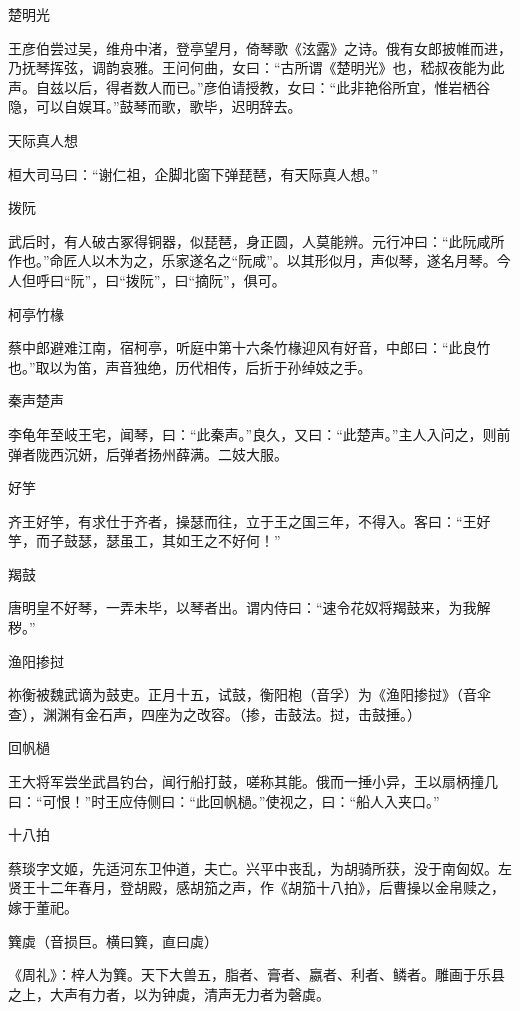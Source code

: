 \documentclass[a4paper,12pt,UTF8,twoside]{ctexbook}
\begin{document}
    楚明光
    
    王彦伯尝过吴，维舟中渚，登亭望月，倚琴歌《泫露》之诗。俄有女郎披帷而进，乃抚琴挥弦，调韵哀雅。王问何曲，女曰：“古所谓《楚明光》也，嵇叔夜能为此声。自兹以后，得者数人而已。”彦伯请授教，女曰：“此非艳俗所宜，惟岩栖谷隐，可以自娱耳。”鼓琴而歌，歌毕，迟明辞去。
    
    天际真人想
    
    桓大司马曰：“谢仁祖，企脚北窗下弹琵琶，有天际真人想。”
    
    拨阮
    
    武后时，有人破古冢得铜器，似琵琶，身正圆，人莫能辨。元行冲曰：“此阮咸所作也。”命匠人以木为之，乐家遂名之“阮咸”。以其形似月，声似琴，遂名月琴。今人但呼曰“阮”，曰“拨阮”，曰“摘阮”，俱可。
    
    柯亭竹椽
    
    蔡中郎避难江南，宿柯亭，听庭中第十六条竹椽迎风有好音，中郎曰：“此良竹也。”取以为笛，声音独绝，历代相传，后折于孙绰妓之手。
    
    秦声楚声
    
    李龟年至岐王宅，闻琴，曰：“此秦声。”良久，又曰：“此楚声。”主人入问之，则前弹者陇西沉妍，后弹者扬州薛满。二妓大服。
    
    好竽
    
    齐王好竽，有求仕于齐者，操瑟而往，立于王之国三年，不得入。客曰：“王好竽，而子鼓瑟，瑟虽工，其如王之不好何！”
    
    羯鼓
    
    唐明皇不好琴，一弄未毕，以琴者出。谓内侍曰：“速令花奴将羯鼓来，为我解秽。”
    
    渔阳掺挝
    
    祢衡被魏武谪为鼓吏。正月十五，试鼓，衡阳枹（音孚）为《渔阳掺挝》（音伞查），渊渊有金石声，四座为之改容。（掺，击鼓法。挝，击鼓捶。）
    
    回帆檛
    
    王大将军尝坐武昌钓台，闻行船打鼓，嗟称其能。俄而一捶小异，王以扇柄撞几曰：“可恨！”时王应侍侧曰：“此回帆檛。”使视之，曰：“船人入夹口。”
    
    十八拍
    
    蔡琰字文姬，先适河东卫仲道，夫亡。兴平中丧乱，为胡骑所获，没于南匈奴。左贤王十二年春月，登胡殿，感胡笳之声，作《胡笳十八拍》，后曹操以金帛赎之，嫁于董祀。
    
    簨虡（音损巨。横曰簨，直曰虡）
    
    《周礼》：梓人为簨。天下大兽五，脂者、膏者、嬴者、利者、鳞者。雕画于乐县之上，大声有力者，以为钟虡，清声无力者为磬虡。
    
\end{document}
